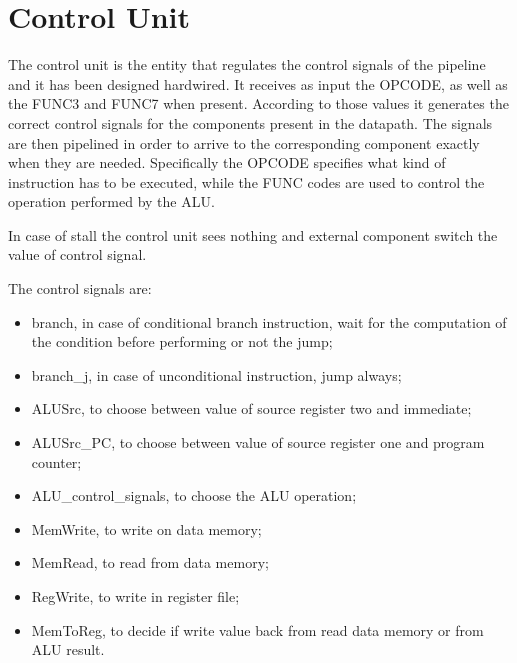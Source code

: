 %
\chapter{Control Unit}
\label{cha3}
The control unit is the entity that regulates the control signals of the pipeline and it has been designed hardwired.
It receives as input the OPCODE, as well as the FUNC3 and FUNC7 when present. 
According to those values it generates the correct control signals for the components present in the datapath. The signals are then pipelined in order to 
arrive to the corresponding component exactly when they are needed. Specifically the OPCODE specifies what kind of instruction has to be executed, while the
FUNC codes are used to control the operation performed by the ALU.

In case of stall the control unit sees nothing and external component switch the value of control signal.

The control signals are:
\begin{itemize}
    \item branch, in case of conditional branch instruction, wait for the computation of the condition before performing or not the jump;
    \item branch\_j, in case of unconditional instruction, jump always;
    \item ALUSrc, to choose between value of source register two and immediate;
    \item ALUSrc\_PC, to choose between value of source register one and program counter;
    \item ALU\_control\_signals, to choose the ALU operation;
    \item MemWrite, to write on data memory;
    \item MemRead, to read from data memory;
    \item RegWrite, to write in register file;
    \item MemToReg, to decide if write value back from read data memory or from ALU result.
\end{itemize}



